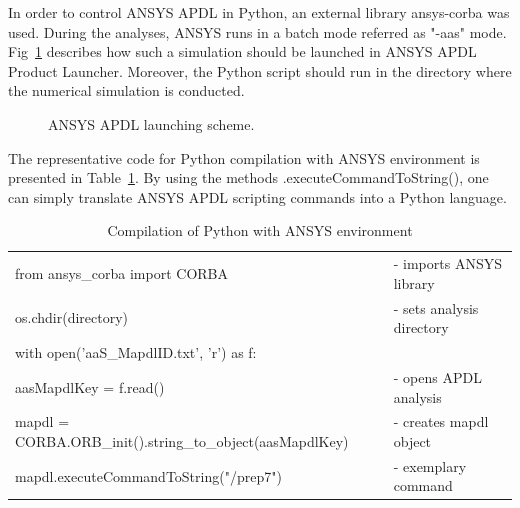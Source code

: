
In order to control ANSYS APDL in Python, an external library ansys-corba was used. During the analyses, ANSYS runs in a batch mode referred as "-aas" mode. Fig~\ref{fig:ansys_apdl_launching_scheme} describes how such a simulation should be launched in ANSYS APDL Product Launcher. Moreover, the Python script should run in the directory where the numerical simulation is conducted.

\begin{figure}[H]
    \centering
    \caption{ANSYS APDL launching scheme.}
    \label{fig:ansys_apdl_launching_scheme}
\end{figure}

The representative code for Python compilation with ANSYS environment is presented in Table~\ref{table:ansys_python_compilation}. By using the methods .executeCommandToString(), one can simply translate ANSYS APDL scripting commands into a Python language.

\begin{table}[H]
    \caption{Compilation of Python with ANSYS environment} 
    \vspace{-1em} 
    \fontsize{10}{10}
    \selectfont 
    \renewcommand{\arraystretch}{1}
    \begin{center}
    \begin{tabular}{ ll }  
    \hline  
        from ansys\_corba import CORBA & - imports ANSYS library \\
        os.chdir(directory) & - sets analysis directory\\
        with open('aaS\_MapdlID.txt', 'r') as f: \\ aasMapdlKey = f.read() & - opens APDL analysis \\
        mapdl = CORBA.ORB\_init().string\_to\_object(aasMapdlKey) & - creates mapdl object \\
    \hline
        mapdl.executeCommandToString("/prep7") & - exemplary command \\
     \end{tabular} 
    \end{center}  
     \label{table:ansys_python_compilation} 
 \end{table}

